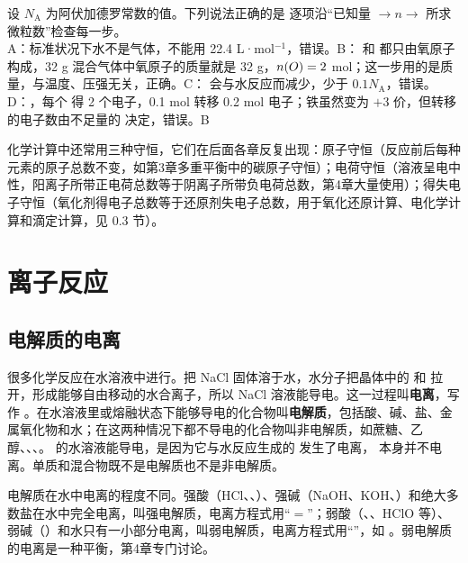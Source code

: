 \begin{liti}[典型]
设 $N_\text{A}$ 为阿伏加德罗常数的值。下列说法正确的是\xz
{}
\tcblower
\silu 逐项沿“已知量 $\to n\to$ 所求微粒数”检查每一步。\\
\jie A：标准状况下水不是气体，不能用 22.4 L·mol$^{-1}$，错误。B： 和  都只由氧原子构成，32 g 混合气体中氧原子的质量就是 32 g，$n(O)=2$ mol；这一步用的是质量，与温度、压强无关，正确。C： 会与水反应而减少，少于 $0.1N_\text{A}$，错误。D：，每个  得 2 个电子，0.1 mol  转移 0.2 mol 电子；铁虽然变为 $+3$ 价，但转移的电子数由不足量的  决定，错误。\daan B
\end{liti}

化学计算中还常用三种守恒，它们在后面各章反复出现：原子守恒（反应前后每种元素的原子总数不变，如第3章多重平衡中的碳原子守恒）；电荷守恒（溶液呈电中性，阳离子所带正电荷总数等于阴离子所带负电荷总数，第4章大量使用）；得失电子守恒（氧化剂得电子总数等于还原剂失电子总数，用于氧化还原计算、电化学计算和滴定计算，见 0.3 节）。

\section{离子反应}

\subsection{电解质的电离}
很多化学反应在水溶液中进行。把 NaCl 固体溶于水，水分子把晶体中的  和  拉开，形成能够自由移动的水合离子，所以 NaCl 溶液能导电。这一过程叫\textbf{电离}，写作 。在水溶液里或熔融状态下能够导电的化合物叫\textbf{电解质}，包括酸、碱、盐、金属氧化物和水；在这两种情况下都不导电的化合物叫非电解质，如蔗糖、乙醇、、、。 的水溶液能导电，是因为它与水反应生成的  发生了电离， 本身并不电离。单质和混合物既不是电解质也不是非电解质。

电解质在水中电离的程度不同。强酸（HCl、、）、强碱（NaOH、KOH、）和绝大多数盐在水中完全电离，叫强电解质，电离方程式用“$=$”；弱酸（、、HClO 等）、弱碱（）和水只有一小部分电离，叫弱电解质，电离方程式用“\ce{<=>}”，如 。弱电解质的电离是一种平衡，第4章专门讨论。

